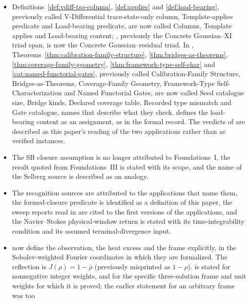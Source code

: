 \begin{itemize}
    \item Definitions~\ref{def:vdiff-tso-column}, \ref{def:applies} and
    \ref{def:load-bearing}, previously called V-Differential
    trace-state-only column, Template-applies predicate and
    Load-bearing predicate, are now called Columns, Template applies and
    Load-bearing content; ,
    previously the Concrete Gaussian--XI triad span, is now the Concrete
        Gaussian--residual triad.  In ,
    Theorems~\ref{thm:calibration-family-structure},
    \ref{thm:bridges-as-theorems}, \ref{thm:coverage-family-geometry},
    \ref{thm:framework-type-self-char} and
    \ref{cat:named-functorial-gates}, previously called
    Calibration-Family Structure, Bridges-as-Theorems, Coverage-Family
    Geometry, Framework-Type Self-Characterization and Named Functorial
    Gates, are now called Seed catalogue size, Bridge kinds, Declared
    coverage table, Recorded type mismatch and Gate catalogue, names
    that describe what they check.   defines the
    load-bearing content as an assignment, as in the formal record.  The verdicts of
     are described as this paper's reading
    of the two applications rather than as verified instances.
    \item The SB closure assumption is no longer attributed to
    Foundations~I, the result quoted from Foundations~III is stated
    with its scope, and the name of the Selberg source is described as
    an analogy.
  \item The recognition sources are attributed to the applications
    that name them, the formed-closure predicate is identified as a
    definition of this paper, the sweep reports read in
     are cited to the first versions of the
    applications, and the Navier--Stokes physical-window return is
    stated with its time-integrability condition and its assumed
    terminal-divergence input.
  \item {} now define the
        observation, the heat excess and the frame explicitly, in the
    Sobolev-weighted Fourier coordinates in which they are formalized.  The
    reflection is \(J(\rho)=1-\bar\rho\) (previously misprinted as
    \(1-\rho\)).   is stated for
    nonnegative integer weights, and 
    for the specific three-solution frame and unit weights for which it
    is proved; the earlier statement for an arbitrary frame was too

\end{itemize}
